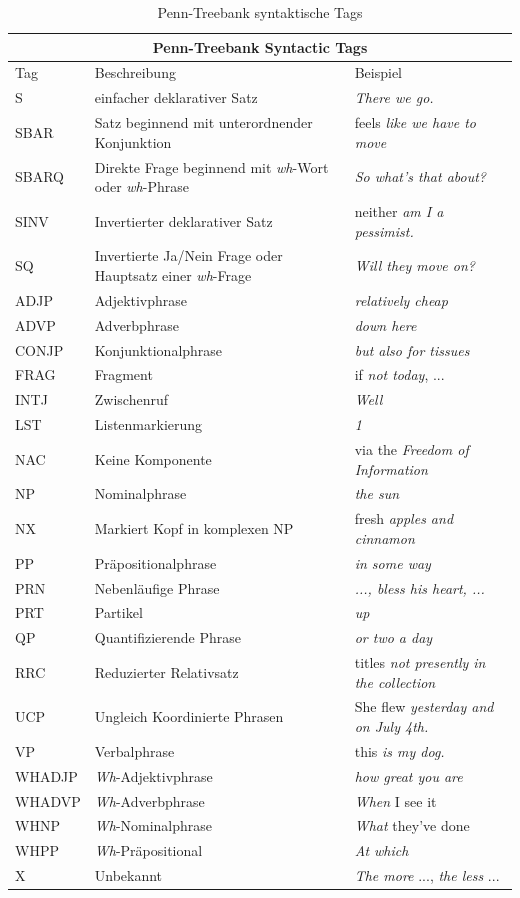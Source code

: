 \begin{table}
\begin{tabular}{ | l p{7cm} p{4cm} |}
	\hline
	\multicolumn{3}{|c|}{Penn-Treebank Syntactic Tags} \\
	\hline
	\hline
	Tag & Beschreibung & Beispiel \\
	\hline
	S & einfacher deklarativer Satz & \textit{There we go.} \\
	SBAR & Satz beginnend mit unterordnender Konjunktion & feels \textit{like we have to move} \\
	SBARQ & Direkte Frage beginnend mit \textit{wh}-Wort oder \textit{wh}-Phrase & \textit{So what's that about?} \\
	SINV & Invertierter deklarativer Satz & neither \textit{am I a pessimist.} \\
	SQ & Invertierte Ja/Nein Frage oder Hauptsatz einer \textit{wh}-Frage & \textit{Will they move on?} \\
	
	ADJP & Adjektivphrase & \textit{relatively cheap} \\
	ADVP & Adverbphrase & \textit{down here} \\
	CONJP & Konjunktionalphrase &  \textit{but also for tissues}\\
	FRAG & Fragment & if \textit{not today}, ... \\
	INTJ & Zwischenruf &  \textit{Well} \\
	LST & Listenmarkierung & \textit{1} \\
	NAC & Keine Komponente & via the \textit{Freedom of Information} \\
	NP & Nominalphrase & \textit{the sun} \\
	NX & Markiert Kopf in komplexen NP & fresh \textit{apples and cinnamon} \\
	PP & Präpositionalphrase & \textit{in some way} \\
	PRN & Nebenläufige Phrase & \textit{..., bless his heart, ...} \\
	PRT & Partikel & \textit{up} \\
	QP & Quantifizierende Phrase & \textit{or two a day} \\
	RRC & Reduzierter Relativsatz & titles \textit{not presently in the collection} \\
	UCP & Ungleich Koordinierte Phrasen & She flew \textit{yesterday and on July 4th.} \\
	VP & Verbalphrase & this \textit{is my dog.} \\
	WHADJP	& \textit{Wh}-Adjektivphrase & \textit{how great you are} \\
	WHADVP & \textit{Wh}-Adverbphrase & \textit{When} I see it\\
	WHNP & \textit{Wh}-Nominalphrase & \textit{What} they've done \\
	WHPP & \textit{Wh}-Präpositional & \textit{At which} \\
	X & Unbekannt & \textit{The more} ..., \textit{the less} ... \\	
	
	\hline
\end{tabular}
\caption{Penn-Treebank syntaktische Tags \cite{penntagsetAusfuehrlich}} 
\label{tab:phrase-tags}
\end{table}
